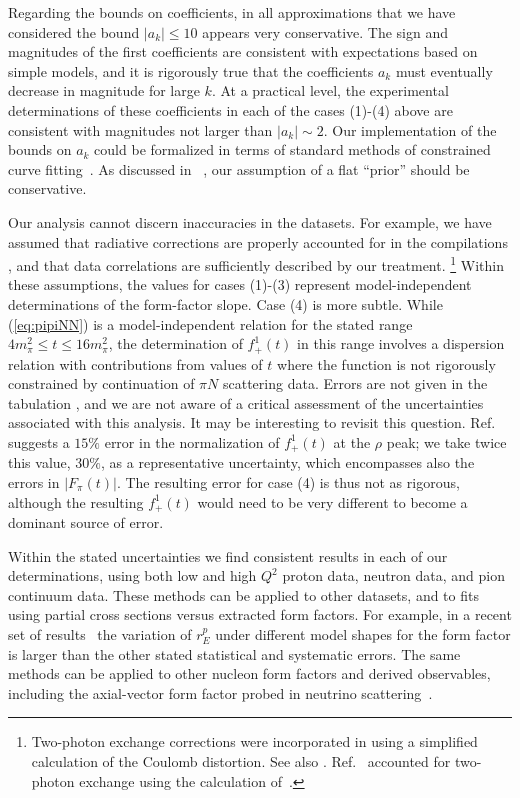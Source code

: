 \documentclass[12pt]{article}
\begin{document}
Regarding the bounds on coefficients, in all approximations that we have considered
the bound $|a_k|\le 10$ appears very conservative.    
The sign and magnitudes of the first coefficients 
are consistent with expectations based on simple models, and it is rigorously true that
the coefficients $a_k$ must eventually decrease in magnitude for large $k$. 
At a practical level, the experimental 
determinations of these coefficients in each of the cases (1)-(4) above are consistent 
with magnitudes not larger than $|a_k| \sim 2$.  
%
Our implementation of the bounds on $a_k$ could be formalized in terms of standard 
methods of constrained curve fitting~\cite{Lepage:2001ym}.  
As discussed in ~\cite{Becher:2005bg}, our assumption of a flat ``prior'' should be conservative.  
%

Our analysis cannot discern inaccuracies in the datasets.  
For example, we have assumed that radiative corrections are properly accounted for in 
the compilations \cite{Rosenfelder:1999cd,Arrington:2007ux}, and that 
data correlations are sufficiently described by our treatment.%
%
\footnote{  
Two-photon exchange corrections were incorporated in \cite{Rosenfelder:1999cd}
using a simplified calculation of the Coulomb distortion.
See also \cite{Sick:2003gm,Blunden:2005jv}.   
Ref.~\cite{Arrington:2007ux} accounted for two-photon exchange
using the 
calculation of~\cite{Blunden:2003sp,Blunden:2005ew}.
}  
%
Within these assumptions, the values for cases (1)-(3) represent
model-independent determinations of the form-factor slope.    
Case (4) is more subtle.  While (\ref{eq:pipiNN}) is a model-independent relation
for the stated range $4m_\pi^2 \le t \le 16 m_\pi^2$, the determination of $f_+^1(t)$ 
in this range involves a dispersion relation with contributions from values of $t$ where the 
function is not rigorously constrained by continuation of $\pi N$ scattering data. 
Errors are not given in the tabulation \cite{Hohler}, 
and we are not aware of a critical assessment of the uncertainties associated with this analysis. 
It may be interesting to revisit this question. 
Ref.~\cite{Hohler:1974ht} suggests a $15\%$ error in the normalization of $f_+^1(t)$ at the $\rho$ peak; 
we take twice this value, $30\%$, as a representative uncertainty, which encompasses also 
the errors in $|F_\pi(t)|$.   
The resulting error for case (4) is thus not as rigorous, although the resulting 
$f_+^1(t)$ would need to be very different to become a dominant source of error. 

Within the stated uncertainties 
we find consistent results in each of our determinations, using both low and
high $Q^2$ proton data, neutron data, and pion continuum data.  
These methods can be applied to other datasets, and to fits using partial 
cross sections versus extracted form factors. 
For example, in a recent set of results~\cite{Bernauer:2010wm} the 
variation of $r_E^p$ under different model shapes for the form factor is larger than 
the other stated statistical and systematic errors. 
The same methods can be applied to other nucleon form factors and derived observables, 
including the axial-vector form factor probed in neutrino scattering~\cite{HillPaz}.   
\end{document}
